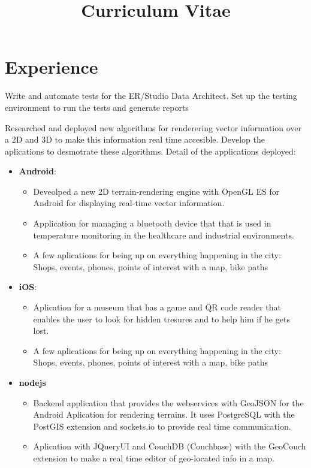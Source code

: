 \documentclass[11pt,a4paper,sans]{moderncv}
\title{Curriculum Vitae}               %
\begin{document}
\maketitle

\section{Experience}

%
%

{Write and automate tests for the ER/Studio Data Architect. Set up the testing environment to run the tests and generate reports}

%
%
{Researched and deployed new algorithms for renderering vector information over a 2D and 3D to make this information real time accesible. Develop the aplications to desmotrate these algorithms.
\newline{}\newline{}
Detail of the applications deployed:
\begin{itemize}
	\item \textbf{Android}:
		\begin{itemize}
			\item Deveolped a new 2D terrain-rendering engine with OpenGL ES for Android for displaying real-time vector information.
			\item Application for managing a bluetooth device that that is used in temperature monitoring in the healthcare and industrial environments.
			\item A few aplications for being up on everything happening in the city: Shops, events, phones, points of interest with a map, bike paths
		\end{itemize}
	\item \textbf{iOS}:
		\begin{itemize}
			\item Aplication for a museum that has a game and QR code reader that enables the user to look for hidden tresures and to help him if he gets lost.
			\item A few aplications for being up on everything happening in the city: Shops, events, phones, points of interest with a map, bike paths
		\end{itemize}
	\item \textbf{nodejs}
		\begin{itemize}
			\item Backend application that provides the webservices with GeoJSON for the Android Aplication for rendering terrains. It uses PostgreSQL with the PostGIS extension and sockets.io to provide real time communication.
			\item Aplication with JQueryUI and CouchDB (Couchbase) with the GeoCouch extension to make a real time editor of geo-located info in a map.
		\end{itemize}
\end{itemize}}
\end{document}
